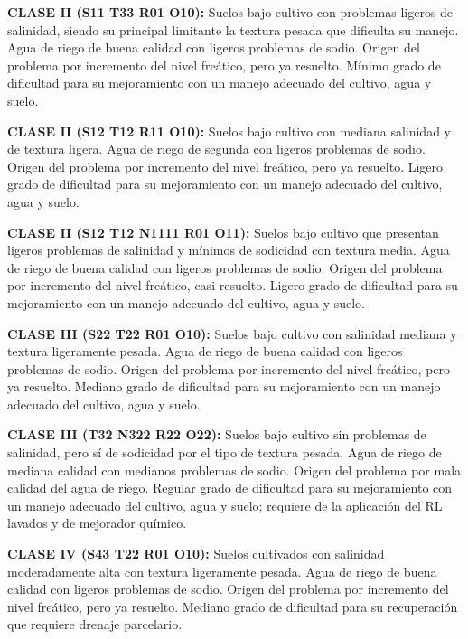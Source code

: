 \begin{example}
    \textbf{CLASE II (S11 T33 R01 O10):} Suelos bajo cultivo con problemas ligeros de salinidad, siendo su principal limitante la textura pesada que dificulta su manejo. Agua de riego de buena calidad con ligeros problemas de sodio. Origen del problema por incremento del nivel freático, pero ya resuelto. Mínimo grado de dificultad para su mejoramiento con un manejo adecuado del cultivo, agua y suelo.
\end{example}
\begin{example}
    \textbf{CLASE II (S12 T12 R11 O10):} Suelos bajo cultivo con mediana salinidad y de textura ligera. Agua de riego de segunda con ligeros problemas de sodio. Origen del problema por incremento del nivel freático, pero ya resuelto. Ligero grado de dificultad para su mejoramiento con un manejo adecuado del cultivo, agua y suelo.
\end{example}
\begin{example}
    \textbf{CLASE II (S12 T12 N1111 R01 O11):} Suelos bajo cultivo que presentan ligeros problemas de salinidad y mínimos de sodicidad con textura media. Agua de riego de buena calidad con ligeros problemas de sodio. Origen del problema por incremento del nivel freático, casi resuelto. Ligero grado de dificultad para su mejoramiento con un manejo adecuado del cultivo, agua y suelo.
\end{example}

\begin{example}
    \textbf{CLASE III (S22 T22 R01 O10):} Suelos bajo cultivo con salinidad mediana y textura ligeramente pesada. Agua de riego de buena calidad con ligeros problemas de sodio. Origen del problema por incremento del nivel freático, pero ya resuelto. Mediano grado de dificultad para su mejoramiento con un manejo adecuado del cultivo, agua y suelo.
\end{example}

\begin{example}
    \textbf{CLASE III (T32 N322 R22 O22):} Suelos bajo cultivo sin problemas de salinidad, pero sí de sodicidad por el tipo de textura pesada. Agua de riego de mediana calidad con medianos problemas de sodio. Origen del problema por mala calidad del agua de riego. Regular grado de dificultad para su mejoramiento con un manejo adecuado del cultivo, agua y suelo; requiere de la aplicación del RL lavados y de mejorador químico.
\end{example}

\begin{example}
    \textbf{CLASE IV (S43 T22 R01 O10):} Suelos cultivados con salinidad moderadamente alta con textura ligeramente pesada. Agua de riego de buena calidad con ligeros problemas de sodio. Origen del problema por incremento del nivel freático, pero ya resuelto. Mediano grado de dificultad para su recuperación que requiere drenaje parcelario.
\end{example}

